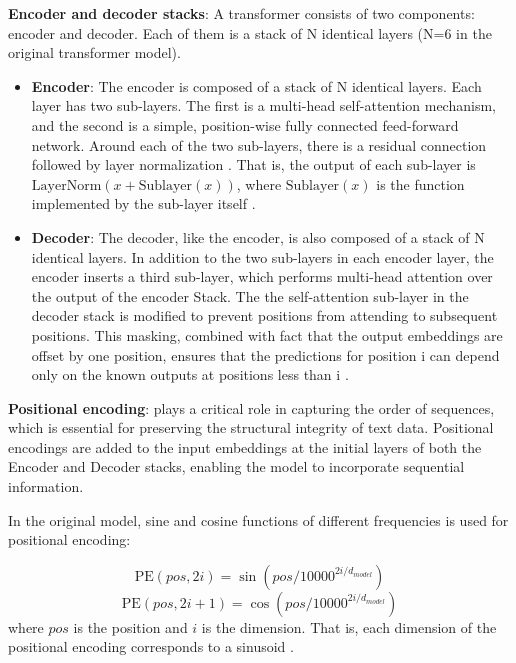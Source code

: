 \textbf{Encoder and decoder stacks}: A transformer consists of two components: encoder and decoder. Each of them is a stack of N identical layers (N=6 in the original transformer model).
\begin{itemize}
    \item \textbf{Encoder}: The encoder is composed of a stack of N identical layers. Each layer has two sub-layers. The first is a multi-head self-attention mechanism, and the second is a simple, position-wise fully connected feed-forward network. Around each of the two sub-layers, there is a residual connection \cite{he2016residualcon} followed by layer normalization \cite{ba2016layernorm}. That is, the output of each sub-layer is $\text{LayerNorm}(x + \text{Sublayer}(x))$, where $\text{Sublayer}(x)$ is the function implemented by the sub-layer itself \cite{vaswani2017}.
    \item \textbf{Decoder}: The decoder, like the encoder, is also composed of a stack of N identical layers. In addition to the two sub-layers in each encoder layer, the encoder inserts a third sub-layer, which performs multi-head attention over the output of the encoder Stack. The the self-attention sub-layer in the decoder stack is modified to prevent positions from attending to subsequent positions. This masking, combined with fact that the output embeddings are offset by one position, ensures that the predictions for position i can depend only on the known outputs at positions less than i \cite{vaswani2017}.
\end{itemize}

\textbf{Positional encoding}: plays a critical role in capturing the order of sequences, which is essential for preserving the structural integrity of text data. Positional encodings are added to the input embeddings at the initial layers of both the Encoder and Decoder stacks, enabling the model to incorporate sequential information. 

In the original model, sine and cosine functions of different frequencies is used for positional encoding:
    
\begin{equation}\label{Eq:PE_sin}
    \text{PE}(pos,2i)=\sin(pos/{10000^{2i/d_{model}}}) 
\end{equation}
\begin{equation}\label{Eq:PE_cos}
    \text{PE}(pos,2i+1)=\cos(pos/{10000^{2i/d_{model}}})
\end{equation}
where $pos$ is the position and $i$ is the dimension. That is, each dimension of the positional encoding corresponds to a sinusoid \cite{vaswani2017}.

